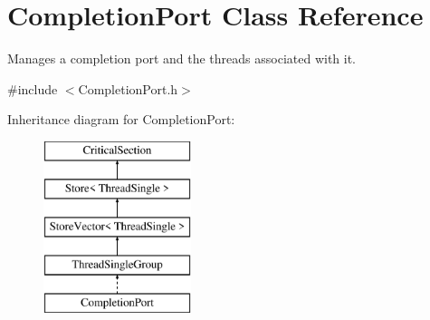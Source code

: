 \hypertarget{class_completion_port}{
\section{CompletionPort Class Reference}
\label{class_completion_port}
}


Manages a completion port and the threads associated with it.  




{\ttfamily \#include $<$CompletionPort.h$>$}

Inheritance diagram for CompletionPort:\begin{figure}[H]
\begin{center}
\leavevmode
\includegraphics[height=5.000000cm]{class_completion_port}
\end{center}
\end{figure}

